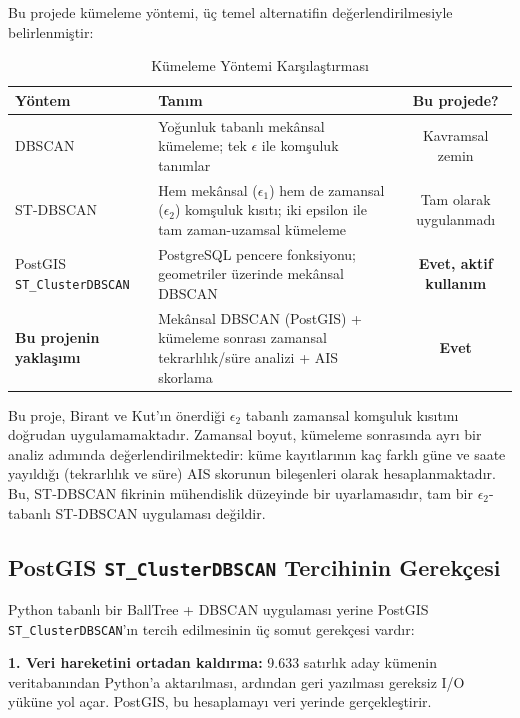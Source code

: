 \documentclass[12pt,a4paper]{article}
\begin{document}
Bu projede kümeleme yöntemi, üç temel alternatifin değerlendirilmesiyle belirlenmiştir:

\begin{table}[H]
\centering
\caption{Kümeleme Yöntemi Karşılaştırması}
\label{tab:method-comparison}
\begin{tabularx}{\textwidth}{l X c}
\toprule
\textbf{Yöntem} & \textbf{Tanım} & \textbf{Bu projede?} \\
\midrule
DBSCAN & Yoğunluk tabanlı mekânsal kümeleme; tek $\epsilon$ ile komşuluk tanımlar & Kavramsal zemin \\
ST-DBSCAN \cite{birant-2007} & Hem mekânsal ($\epsilon_1$) hem de zamansal ($\epsilon_2$) komşuluk kısıtı; iki epsilon ile tam zaman-uzamsal kümeleme & Tam olarak uygulanmadı \\
PostGIS \texttt{ST\_ClusterDBSCAN} & PostgreSQL pencere fonksiyonu; geometriler üzerinde mekânsal DBSCAN & \textbf{Evet, aktif kullanım} \\
\midrule
\textbf{Bu projenin yaklaşımı} & Mekânsal DBSCAN (PostGIS) + kümeleme sonrası zamansal tekrarlılık/süre analizi + AIS skorlama & \textbf{Evet} \\
\bottomrule
\end{tabularx}
\end{table}

\begin{importantbox}
Bu proje, Birant ve Kut'ın \cite{birant-2007} önerdiği $\epsilon_2$ tabanlı zamansal komşuluk kısıtını doğrudan uygulamamaktadır. Zamansal boyut, kümeleme sonrasında ayrı bir analiz adımında değerlendirilmektedir: küme kayıtlarının kaç farklı güne ve saate yayıldığı (tekrarlılık ve süre) AIS skorunun bileşenleri olarak hesaplanmaktadır. Bu, ST-DBSCAN fikrinin mühendislik düzeyinde bir uyarlamasıdır, tam bir $\epsilon_2$-tabanlı ST-DBSCAN uygulaması değildir.
\end{importantbox}

\subsection{PostGIS \texttt{ST\_ClusterDBSCAN} Tercihinin Gerekçesi}

Python tabanlı bir BallTree + DBSCAN uygulaması yerine PostGIS \texttt{ST\_ClusterDBSCAN}'ın tercih edilmesinin üç somut gerekçesi vardır:

\textbf{1. Veri hareketini ortadan kaldırma:} 9.633 satırlık aday kümenin veritabanından Python'a aktarılması, ardından geri yazılması gereksiz I/O yüküne yol açar. PostGIS, bu hesaplamayı veri yerinde gerçekleştirir.
\end{document}
